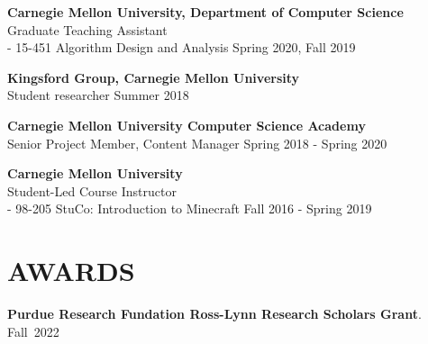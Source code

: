 \documentclass[margin, 10pt]{res} %
\begin{document}
\begin{resume}
{\bf Carnegie Mellon University, Department of Computer Science}\\
Graduate Teaching Assistant\\
\hphantom{12}- 15-451 Algorithm Design and Analysis \hfill Spring 2020, Fall 2019


{\bf Kingsford Group, Carnegie Mellon University}\\
Student researcher \hfill Summer 2018

{\bf Carnegie Mellon University Computer Science Academy}\\
Senior Project Member, Content Manager \hfill Spring 2018 - Spring 2020

{\bf Carnegie Mellon University}\\
Student-Led Course Instructor\\
\hphantom{12}- 98-205 StuCo: Introduction to Minecraft \hfill Fall 2016 - Spring 2019

\section{AWARDS}
{\bf Purdue Research Fundation Ross-Lynn Research Scholars Grant}. \hfill Fall~2022


\end{resume}
\end{document}
